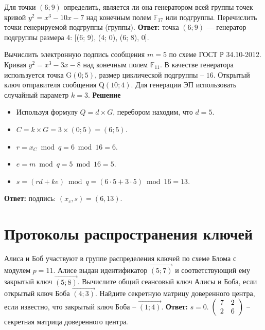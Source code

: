 \tasknumber Для точки $\left(6; 9\right)$ определить, является ли она генератором всей группы точек кривой $y^2 = x^3 - 10 x - 7$ над конечным полем $\mathbb{F}_{17}$ или подгруппы. Перечислить точки генерируемой подгруппы (группы).
\medbreak
\textbf{Ответ:} точка $\left(6; 9\right)$ — генератор подгруппы размера 4: [(6; 9), (4; 0), (6; 8), 0].
\bigbreak

\tasknumber Вычислить электронную подпись сообщения $m=5$ по схеме ГОСТ Р 34.10-2012. Кривая $y^2 = x^3 - 3 x - 8$ над конечным полем $\mathbb{F}_{11}$. В качестве генератора используется точка G$\left(0; 5\right)$, размер циклической подгруппы -- $16$. Открытый ключ отправителя сообщения Q$\left(10; 4\right)$. Для генерации ЭП использовать случайный параметр $k=3$.
\medbreak
\textbf{Решение}
\begin{itemize}
\item Используя формулу $Q = d \times G$, перебором находим, что $d = 5$.
\item $C = k \times G = 3 \times \left(0; 5\right) = \left(6; 5\right)$.
\item $r = x_C \bmod q = 6 \bmod 16 = 6$.
\item $e = m \bmod q = 5 \bmod 16 = 5$.
\item $s = ( r d + k e ) \bmod q = ( 6 \cdot 5 + 3 \cdot 5 ) \bmod 16 = 13$.
\end{itemize}
\medbreak
\textbf{Ответ:} подпись: $(x_c, s) = (6, 13)$.
\bigbreak

\section{Протоколы распространения ключей}
\tasksection

\tasknumber Алиса и Боб участвуют в группе распределения ключей по схеме Блома с модулем $p = 11$. Алисе выдан идентификатор $\overrightarrow{(5; 7)}$ и соответствующий ему закрытый ключ $\overrightarrow{(5; 8)}$. Вычислите общий сеансовый ключ Алисы и Боба, если открытый ключ Боба $\overrightarrow{(4; 3)}$. Найдите секретную матрицу доверенного центра, если известно, что закрытый ключ Боба -- $\overrightarrow{(1; 4)}$.
\medbreak
\textbf{Ответ:} $s = 0$. $\left( {\begin{array}{*{20}c}
   7 & 2  \\
   2 & 6  \\
\end{array}} \right)$ -- секретная матрица доверенного центра.
\bigbreak

